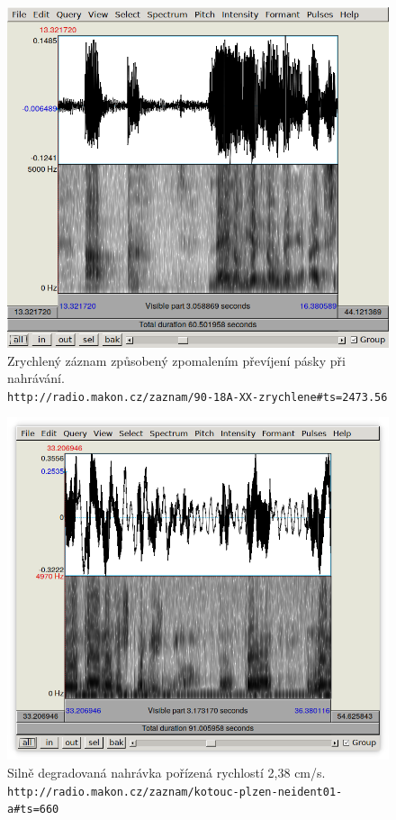 
\begin{figure}[htpb]
\includegraphics[scale=0.88]{rc/spectrum-accel-90-18A.png}
\caption{
    Zrychlený záznam způsobený zpomalením převíjení pásky při nahrávání.\\
    \texttt{http://radio.makon.cz/zaznam/90-18A-XX-zrychlene\#ts=2473.56}
}
\label{fig:spectr-accel}
\end{figure}

\begin{figure}[htpb]
\includegraphics[scale=0.84]{rc/spectrum-2cms-ktplzneid01a.png}
\caption{
    Silně degradovaná nahrávka pořízená rychlostí 2,38 cm/s.\\
    \texttt{http://radio.makon.cz/zaznam/kotouc-plzen-neident01-a\#ts=660}
}
\label{fig:spectr-2cms}
\end{figure}

